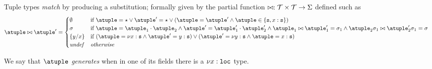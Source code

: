 Tuple types \emph{match} by producing a substitution; formally given
by the partial function
$\matches : \tupleset \times \tupleset \to \Sigma$ defined such as
\[
  \atuple \matches \atuple' \generates
    \begin{cases}
     \emptyset
    & 
    \text{if  } \atuple = \wildcard \vee \atuple' = \wildcard  \vee (\atuple = \atuple' \land \atuple\in\{\asort, x : \asort\})
    \\
    \sigma
    &
    \text{if } \atuple = \atuple_1 \cdot \atuple_2
    \land  \atuple' = \atuple'_1 \cdot \atuple'_2
    \land \atuple_1 \matches \atuple'_1 \generates \sigma_1
    \land \atuple_2\sigma_1 \matches \atuple'_2\sigma_1 \generates \sigma
    \\
    \sust x y 
    &
    \text{if  } (\atuple = \nu x : \asort \land \atuple' = y: \asort) \vee  (\atuple' = \nu y : \asort \land \atuple = x: \asort) 
    \\
    \textit{undef} & \textit{otherwise}
   \end{cases}
\]

%
%


%
We say that $\atuple$ \emph{generates} when in one of its fields there
is a $\nu x: \asort[loc]$ type. 
%

%



